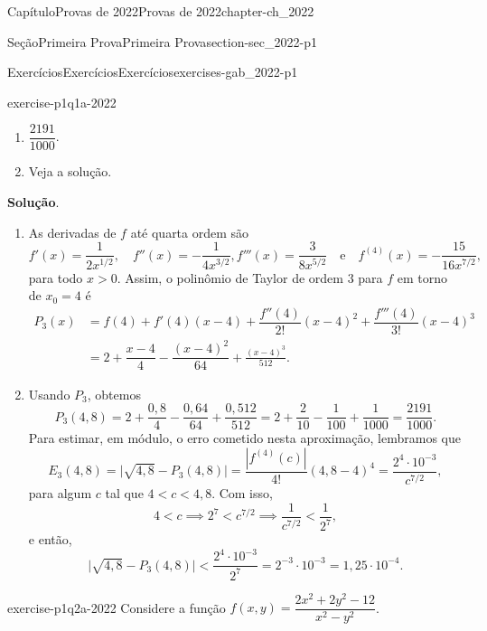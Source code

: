 \documentclass[oneside,10pt,]{book}
\newcommand{\blocktitlefont}{\relax}
\numberwithin{equation}{section}
\begin{document}
\begin{chapterptx}{Capítulo}{Provas de 2022}{}{Provas de 2022}{}{}{chapter-ch_2022}
\begin{sectionptx}{Seção}{Primeira Prova}{}{Primeira Prova}{}{}{section-sec_2022-p1}
\begin{exercises-subsection-numberless}{Exercícios}{Exercícios}{}{Exercícios}{}{}{exercises-gab_2022-p1}
\begin{divisionexercise}{1}{}{}{exercise-p1q1a-2022}
\begin{enumerate}[label=\alph*]
\item{}\(\dfrac{2191}{1000}\).%
\item{}Veja a solução.%
\end{enumerate}
%
\par\smallskip%
\noindent\textbf{\blocktitlefont Solução}.\hypertarget{solution-p1q1a-2022-c}{}\quad{}%
\begin{enumerate}[label=\alph*]
\item{}As derivadas de \(f\) até quarta ordem são%
\begin{equation*}
f'(x)=\dfrac{1}{2x^{1/2}},\quad
f''(x)=-\dfrac{1}{4x^{3/2}}, %
f'''(x)=\dfrac{3}{8x^{5/2}}\quad\text{e}\quad
f^{(4)}(x)=-\dfrac{15}{16x^{7/2}},
\end{equation*}
para todo \(x>0\). Assim, o polinômio de Taylor de ordem \(3\) para \(f\) em torno de \(x_0=4\) é%
\begin{align*}
P_3(x)&=f(4)+f'(4)(x-4)+\dfrac{f''(4)}{2!}(x-4)^2+
\dfrac{f'''(4)}{3!}(x-4)^3\\
&=2+\dfrac{x-4}{4}-\dfrac{(x-4)^2}{64}+\frac{(x-4)^3}{512}.
\end{align*}
%
\item{}Usando \(P_3\), obtemos%
\begin{equation*}
P_3(4,8)=2+\dfrac{0,8}{4}-\dfrac{0,64}{64}+\dfrac{0,512}{512}
=2+\dfrac{2}{10}-\dfrac{1}{100}+\frac{1}{1000}=\dfrac{2191}{1000}.
\end{equation*}
Para estimar, em módulo, o erro cometido nesta aproximação, lembramos que%
\begin{equation*}
E_3(4,8)=\Big|\sqrt{4,8}-P_3(4,8)\Big|
=\dfrac{|f^{(4)}(c)|}{4!}(4,8-4)^4=\dfrac{2^4\cdot
10^{-3}}{c^{7/2}},
\end{equation*}
para algum \(c\) tal que \(4<c<4,8\). Com isso,%
\begin{equation*}
4<c\implies
2^7<c^{7/2}\implies\dfrac{1}{c^{7/2}}<\dfrac{1}{2^7},
\end{equation*}
e então,%
\begin{equation*}
\Big|\sqrt{4,8}-P_3(4,8)\Big|<\dfrac{2^4\cdot
10^{-3}}{2^7}=2^{-3}\cdot 10^{-3}=1,25\cdot 10^{-4}.
\end{equation*}
%
\end{enumerate}
%
\end{divisionexercise}%
\begin{divisionexercise}{2}{}{}{exercise-p1q2a-2022}%
Considere a função \(f(x,y)=\dfrac{2x^2+2y^2-12}{x^2-y^2}\). %
\begin{enumerate}[label=\alph*]

\end{enumerate}
\end{divisionexercise}
\end{exercises-subsection-numberless}
\end{sectionptx}
\end{chapterptx}
\end{document}
